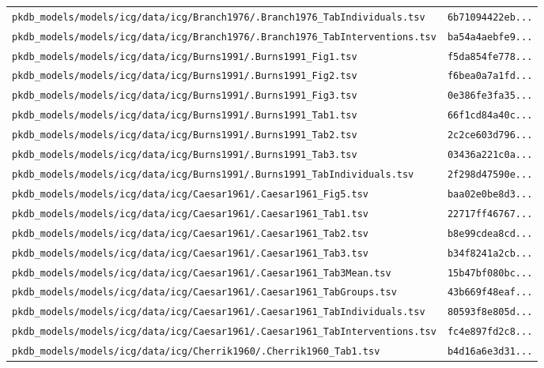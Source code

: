 \documentclass{article}
\begin{document}
\begin{longtable}{ll}
\texttt{pkdb\_models/models/icg/data/icg/Branch1976/.Branch1976\_TabIndividuals.tsv} & \texttt{6b71094422eb...} \\
\texttt{pkdb\_models/models/icg/data/icg/Branch1976/.Branch1976\_TabInterventions.tsv} & \texttt{ba54a4aebfe9...} \\
\texttt{pkdb\_models/models/icg/data/icg/Burns1991/.Burns1991\_Fig1.tsv} & \texttt{f5da854fe778...} \\
\texttt{pkdb\_models/models/icg/data/icg/Burns1991/.Burns1991\_Fig2.tsv} & \texttt{f6bea0a7a1fd...} \\
\texttt{pkdb\_models/models/icg/data/icg/Burns1991/.Burns1991\_Fig3.tsv} & \texttt{0e386fe3fa35...} \\
\texttt{pkdb\_models/models/icg/data/icg/Burns1991/.Burns1991\_Tab1.tsv} & \texttt{66f1cd84a40c...} \\
\texttt{pkdb\_models/models/icg/data/icg/Burns1991/.Burns1991\_Tab2.tsv} & \texttt{2c2ce603d796...} \\
\texttt{pkdb\_models/models/icg/data/icg/Burns1991/.Burns1991\_Tab3.tsv} & \texttt{03436a221c0a...} \\
\texttt{pkdb\_models/models/icg/data/icg/Burns1991/.Burns1991\_TabIndividuals.tsv} & \texttt{2f298d47590e...} \\
\texttt{pkdb\_models/models/icg/data/icg/Caesar1961/.Caesar1961\_Fig5.tsv} & \texttt{baa02e0be8d3...} \\
\texttt{pkdb\_models/models/icg/data/icg/Caesar1961/.Caesar1961\_Tab1.tsv} & \texttt{22717ff46767...} \\
\texttt{pkdb\_models/models/icg/data/icg/Caesar1961/.Caesar1961\_Tab2.tsv} & \texttt{b8e99cdea8cd...} \\
\texttt{pkdb\_models/models/icg/data/icg/Caesar1961/.Caesar1961\_Tab3.tsv} & \texttt{b34f8241a2cb...} \\
\texttt{pkdb\_models/models/icg/data/icg/Caesar1961/.Caesar1961\_Tab3Mean.tsv} & \texttt{15b47bf080bc...} \\
\texttt{pkdb\_models/models/icg/data/icg/Caesar1961/.Caesar1961\_TabGroups.tsv} & \texttt{43b669f48eaf...} \\
\texttt{pkdb\_models/models/icg/data/icg/Caesar1961/.Caesar1961\_TabIndividuals.tsv} & \texttt{80593f8e805d...} \\
\texttt{pkdb\_models/models/icg/data/icg/Caesar1961/.Caesar1961\_TabInterventions.tsv} & \texttt{fc4e897fd2c8...} \\
\texttt{pkdb\_models/models/icg/data/icg/Cherrik1960/.Cherrik1960\_Tab1.tsv} & \texttt{b4d16a6e3d31...} \\

\end{longtable}
\end{document}

